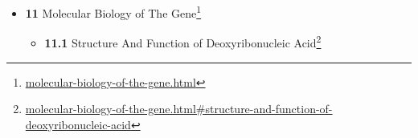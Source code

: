 \documentclass[
]{article}
\providecommand{\tightlist}{%
  \setlength{\itemsep}{0pt}\setlength{\parskip}{0pt}}
\providecommand{\tightlist}{%
  \setlength{\itemsep}{0pt}\setlength{\parskip}{0pt}}
\let\rmarkdownfootnote\footnote%
\def\footnote{\protect\rmarkdownfootnote}
\renewcommand{\href}[2]{#2\footnote{\url{#1}}}
\theoremstyle{definition}
\theoremstyle{definition}
\theoremstyle{definition}
\theoremstyle{remark}
\begin{document}
\begin{itemize}
  \begin{itemize}
  \tightlist
  \item
    \href{classical-genetics.html\#mendelian-inheritance}{\emph{}\textbf{10.1}
    Mendelian Inheritance}

    \begin{itemize}
    \tightlist
    \item
      \href{classical-genetics.html\#mendels-genetic-discoveries}{\emph{}\textbf{10.1.1}
      Mendel's Genetic Discoveries}
    \item
      \href{classical-genetics.html\#law-of-dominance-and-uniformity}{\emph{}\textbf{10.1.2}
      Law of Dominance and Uniformity}
    \item
      \href{classical-genetics.html\#law-of-segregation-of-genes}{\emph{}\textbf{10.1.3}
      Law of Segregation of genes}
    \item
      \href{classical-genetics.html\#law-of-independent-assortment}{\emph{}\textbf{10.1.4}
      Law of Independent Assortment}
    \item
      \href{classical-genetics.html\#mendelian-trait}{\emph{}\textbf{10.1.5}
      Mendelian Trait}
    \item
      \href{classical-genetics.html\#zygosity}{\emph{}\textbf{10.1.6}
      Zygosity}
    \item
      \href{classical-genetics.html\#monohybrid-cross}{\emph{}\textbf{10.1.7}
      Monohybrid Cross}
    \item
      \href{classical-genetics.html\#punnett-square}{\emph{}\textbf{10.1.8}
      Punnett Square}
    \item
      \href{classical-genetics.html\#dihybrid-cross}{\emph{}\textbf{10.1.9}
      Dihybrid Cross}
    \end{itemize}
  \item
    \href{classical-genetics.html\#mendelian-traits-in-humans}{\emph{}\textbf{10.2}
    Mendelian Traits in Humans}
  \item
    \href{classical-genetics.html\#non-mendelian-inheritance}{\emph{}\textbf{10.3}
    Non-Mendelian Inheritance}
  \end{itemize}
\item
  \href{molecular-biology-of-the-gene.html}{\emph{}\textbf{11} Molecular
  Biology of The Gene}

  \begin{itemize}
  \tightlist
  \item
    \href{molecular-biology-of-the-gene.html\#structure-and-function-of-deoxyribonucleic-acid}{\emph{}\textbf{11.1}
    Structure And Function of Deoxyribonucleic Acid}


\end{itemize}
\end{itemize}
\end{document}

